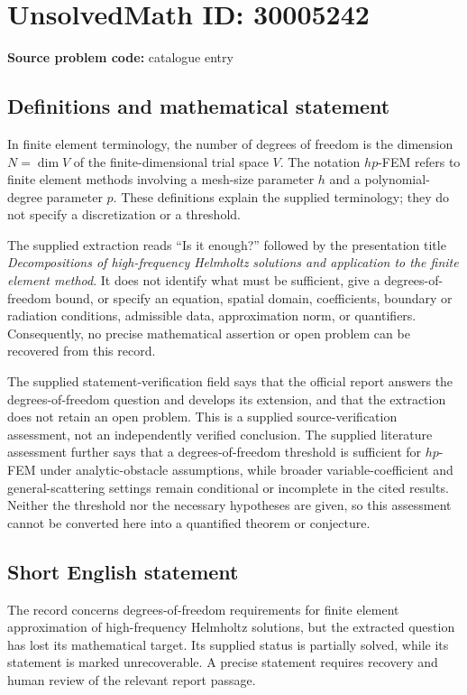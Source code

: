 \documentclass[11pt]{article}
\begin{document}
\section*{UnsolvedMath ID: 30005242}
\textbf{Source problem code:} catalogue entry
\subsection{Definitions and mathematical statement}
In finite element terminology, the number of degrees of freedom is the dimension \(N=\dim V\) of the finite-dimensional trial space \(V\). The notation \(hp\)-FEM refers to finite element methods involving a mesh-size parameter \(h\) and a polynomial-degree parameter \(p\). These definitions explain the supplied terminology; they do not specify a discretization or a threshold.

The supplied extraction reads ``Is it enough?'' followed by the presentation title \emph{Decompositions of high-frequency Helmholtz solutions and application to the finite element method}. It does not identify what must be sufficient, give a degrees-of-freedom bound, or specify an equation, spatial domain, coefficients, boundary or radiation conditions, admissible data, approximation norm, or quantifiers. Consequently, no precise mathematical assertion or open problem can be recovered from this record.

The supplied statement-verification field says that the official report answers the degrees-of-freedom question and develops its extension, and that the extraction does not retain an open problem. This is a supplied source-verification assessment, not an independently verified conclusion. The supplied literature assessment further says that a degrees-of-freedom threshold is sufficient for \(hp\)-FEM under analytic-obstacle assumptions, while broader variable-coefficient and general-scattering settings remain conditional or incomplete in the cited results. Neither the threshold nor the necessary hypotheses are given, so this assessment cannot be converted here into a quantified theorem or conjecture.
\subsection{Short English statement}
The record concerns degrees-of-freedom requirements for finite element approximation of high-frequency Helmholtz solutions, but the extracted question has lost its mathematical target. Its supplied status is partially solved, while its statement is marked unrecoverable. A precise statement requires recovery and human review of the relevant report passage.
\end{document}
